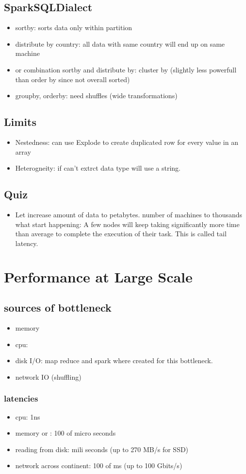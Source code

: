 \subsection{SparkSQLDialect}
\begin{itemize}
    \item sortby: sorts data only within partition
    \item distribute by country: all data with same country will end up on same machine
    \item or combination sortby and distribute by: cluster by (slightly less powerfull than order by since not overall sorted)
    \item groupby, orderby: need shuffles (wide transformations)
\end{itemize}


\subsection{Limits}
\begin{itemize}
    \item Nestedness: can use Explode to create duplicated row for every value in an array
    \item Heterogneity: if can't extrct data type will use a string.
\end{itemize}

\subsection{Quiz}
\begin{itemize}
    \item Let increase amount of data to petabytes. number of machines to thousands what start happening:
    A few nodes will keep taking significantly more time than average to complete the execution of their task.
    This is called tail latency.
\end{itemize}



\section{Performance at Large Scale}
\subsection{sources of bottleneck}
\begin{itemize}
    \item memory
    \item cpu:
    \item disk I/O: map reduce and spark where created for this bottleneck.
    \item network IO (shuffling)
\end{itemize}

\subsubsection{latencies}
\begin{itemize}
    \item cpu: 1ns
    \item memory or : 100 of micro seconds
    \item reading from disk: mili seconds (up to 270 MB/s for SSD)
    \item network across continent: 100 of ms (up to 100 Gbits/s)
\end{itemize}





